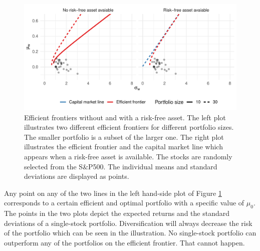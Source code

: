\documentclass[12pt, oneside]{book}\usepackage{knitr}
\begin{document}
{\begin{knitrout}
\begin{figure}
{\centering \includegraphics[width=\maxwidth]{figure/mertons_efficient_frontier-1} 

}

\caption[Efficient frontiers without and with a risk-free asset]{Efficient frontiers without and with a risk-free asset. The left plot illustrates two different efficient frontiers for different portfolio sizes. The smaller portfolio is a subset of the larger one. The right plot illustrates the efficient frontier and the capital market line which appears when a risk-free asset is available. The stocks are randomly selected from the S\&P500. The individual means and standard deviations are displayed as points.}\label{fig:mertons_efficient_frontier}
\end{figure}

\end{knitrout}
Any point on any of the two lines in the left hand-side plot of Figure \ref{fig:mertons_efficient_frontier} corresponds to a certain efficient and optimal portfolio with a specific value of $\mu_0$. 
The points in the two plots depict the expected returns and the standard deviations of a single-stock portfolio. 
Diversification will always decrease the risk of the portfolio which can be seen in the illustration. 
No single-stock portfolio can outperform any of the portfolios on the efficient frontier. 
That cannot happen. 

}
\end{document}
